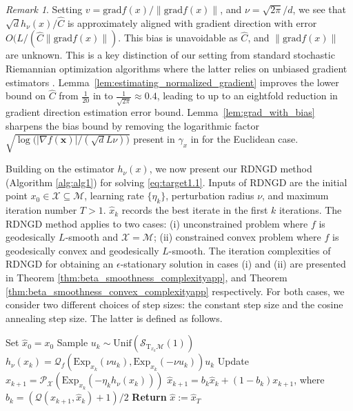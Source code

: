 \documentclass{article}
\newcommand{\rgrad}{\mathrm{grad}}
\newcommand{\pert}{\nu}
\theoremstyle{plain}
\theoremstyle{definition}
\theoremstyle{remark}
\newtheorem{remark}[theorem]{Remark}
\begin{document}
\begin{remark}
Setting $v=\rgrad f(x)/\|\rgrad f(x)\|$, and $\pert=\sqrt{2\pi}/d$, we see that $\sqrt{d}h_\pert (x)/\hat{C}$ is approximately aligned with gradient direction with error $O(L/(\hat{C}\|\rgrad f(x)\|)$. This bias is unavoidable as $\hat{C}$, and $\|\rgrad f(x)\|$ are unknown. This is a key distinction of our setting from standard stochastic Riemannian optimization algorithms where the latter relies on unbiased gradient estimators \cite{SGD_riemannian, tripuraneni2018averaging}. Lemma~\ref{lem:estimating_normalized_gradient} improves the lower bound on $\hat{C}$ from $\tfrac{1}{20}$ in \citep{pmlr-v139-saha21b} to $\tfrac{1}{\sqrt{2\pi}}\approx0.4$, leading to up to an eightfold reduction in gradient direction estimation error bound.
Lemma~\ref{lem:grad_with_bias} sharpens the bias bound by removing the logarithmic factor $\sqrt{\log\big(|\nabla f(\mathbf{x})|/(\sqrt{d}L\nu)\big)}$ present in $\gamma_x$ in \citep{pmlr-v139-saha21b} for the Euclidean case.
\end{remark}

Building on the estimator $h_\pert(x)$, we now present our RDNGD method (Algorithm \ref{alg:alg1}) for solving \eqref{eq:target1.1}. Inputs of RDNGD are the initial point $x_0\in\mathcal{X}\subseteq\mathcal{M}$, learning rate $\{\eta_k\}$, perturbation radius $\nu$, and maximum iteration number $T>1$. $\hat{x}_k$ records the best iterate in the first $k$ iterations. 
The RDNGD method applies to two cases: (i) unconstrained problem where $f$ is geodesically $L$-smooth and $\mathcal{X}=\mathcal{M}$; (ii) constrained convex problem where $f$ is geodesically convex and geodesically $L$-smooth. The iteration complexities of RDNGD for obtaining an $\epsilon$-stationary solution in cases (i) and (ii) are presented in Theorem \ref{thm:beta_smoothness_complexityapp}, and Theorem \ref{thm:beta_smoothness_convex_complexityapp} respectively. For both cases, we consider two different choices of step sizes: the constant step size and the cosine annealing step size. The latter is defined as follows. 

\begin{algorithm}[t]
\caption{Riemannian Dueling Normalized Gradient Descent (\textbf{RDNGD})}
\label{alg:alg1}
\begin{algorithmic}[1]
\STATE Set $\hat{x}_0=x_0$
    \STATE Sample $u_k \sim \mathrm{Unif}(\mathcal{S}_{\mathrm{T}_{x_k}\mathcal{M}}(1))$
    \STATE $h_\pert(x_k) = \mathcal{Q}_f(\mathrm{Exp}_{x_k}(\pert u_k),\mathrm{Exp}_{x_k}(-\pert u_k))u_k$
    \STATE Update $x_{k+1} = \mathcal{P}_{\mathcal{X}}\left(\mathrm{Exp}_{x_k}(- \eta_k h_\pert(x_k))\right)$
    \STATE $\hat{x}_{k+1}=b_k\hat{x}_{k}+(1-b_k)x_{k+1}$, 
    \STATE \quad where $b_k=(\mathcal{Q}(x_{k+1},\hat{x}_k)+1)/2$
\ENDFOR
\STATE \textbf{Return} $\hat{x}:=\hat{x}_{T}$
\end{algorithmic}
\end{algorithm}
\end{document}

